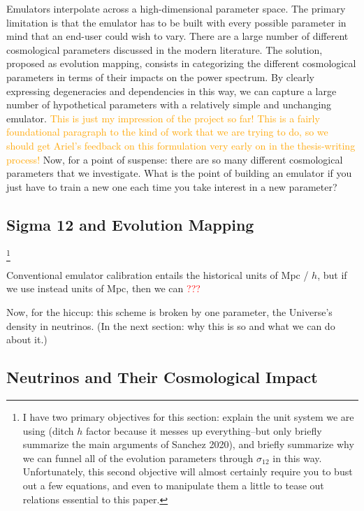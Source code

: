\documentclass[11pt]{article}
\begin{document}
Emulators interpolate across a high-dimensional parameter space. The primary
limitation is that the emulator has to be built with every possible parameter
in mind that an end-user could wish to vary. There are a large number of
different cosmological parameters discussed in the modern literature. The
solution, proposed as evolution mapping, consists in categorizing the
different cosmological parameters in terms of their impacts on the power
spectrum. By clearly expressing degeneracies and dependencies in this way, we
can capture a large number of hypothetical parameters with a relatively simple
and unchanging emulator. \textcolor{orange}{This is just my impression of the
project so far! This is a fairly foundational paragraph to the kind of work
that we are trying to do, so we should get Ariel's feedback on this
formulation very early on in the thesis-writing process!}
Now, for a point of suspense: there are so many different cosmological
parameters that we investigate. What is the point of building an emulator if
you just have to train a new one each time you take interest in a new
parameter?

\begin{centering}
\section{Sigma 12 and Evolution Mapping}
\end{centering}

\footnote{
    I have two primary objectives for this section: explain the unit system
    we are using (ditch $h$ factor because it messes up everything--but
    only briefly summarize the main arguments of Sanchez 2020), and briefly
    summarize why we can funnel all of the evolution parameters through
    $\sigma_{12}$ in this way. Unfortunately, this second objective will
    almost certainly require you to bust out a few equations, and even to
    manipulate them a little to tease out relations essential to this paper.
}

Conventional emulator calibration entails the historical units of Mpc / $h$,
but if we use instead units of Mpc, then we can \textcolor{red}{???} 

Now, for the hiccup: this scheme is broken by one parameter, the Universe's
density in neutrinos. (In the next section: why this is so and what we can do
about it.)

\begin{centering}
\section{Neutrinos and Their Cosmological Impact}
\end{centering}
\end{document}
